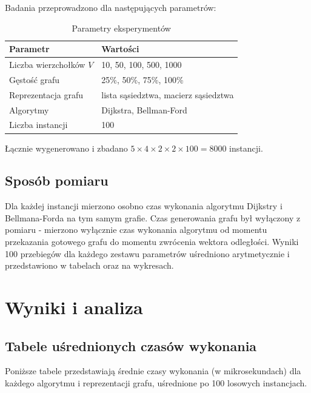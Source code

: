 \documentclass[12pt,a4paper]{article}
\begin{document}
Badania przeprowadzono dla następujących parametrów:
 
\begin{table}[H]
    \centering
    \caption{Parametry eksperymentów}
    \begin{tabular}{ll}
        \toprule
        \textbf{Parametr} & \textbf{Wartości} \\
        \midrule
        Liczba wierzchołków $V$ & 10, 50, 100, 500, 1000 \\
        Gęstość grafu           & 25\%, 50\%, 75\%, 100\% \\
        Reprezentacja grafu     & lista sąsiedztwa, macierz sąsiedztwa \\
        Algorytmy               & Dijkstra, Bellman-Ford \\
        Liczba instancji        & 100 \\
        \bottomrule
    \end{tabular}
\end{table}
 
Łącznie wygenerowano i zbadano
$5 \times 4 \times 2 \times 2 \times 100 = 8000$ instancji.
 
\subsection{Sposób pomiaru}
 
Dla każdej instancji mierzono osobno czas wykonania algorytmu Dijkstry
i Bellmana-Forda na tym samym grafie. Czas generowania grafu był wyłączony
z pomiaru - mierzono wyłącznie czas wykonania algorytmu od momentu
przekazania gotowego grafu do momentu zwrócenia wektora odległości.
Wyniki 100 przebiegów dla każdego zestawu parametrów uśredniono
arytmetycznie i przedstawiono w tabelach oraz na wykresach.
 
\section{Wyniki i analiza}
 
 
 
\subsection{Tabele uśrednionych czasów wykonania}
 
Poniższe tabele przedstawiają średnie czasy wykonania (w mikrosekundach) dla każdego algorytmu
i reprezentacji grafu, uśrednione po 100 losowych instancjach.
 
\end{document}
